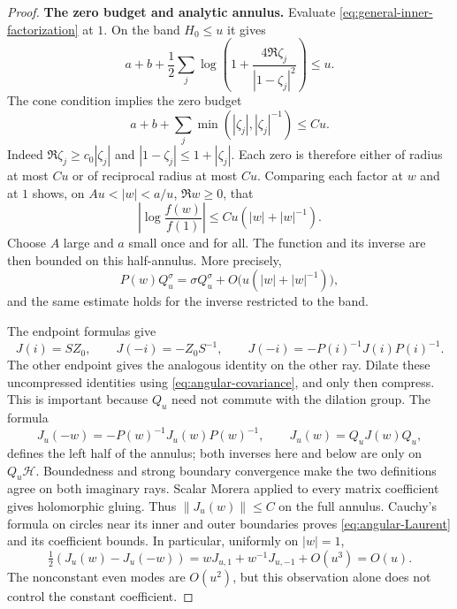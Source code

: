 \begin{proof}
\smallskip\noindent\textbf{The zero budget and analytic annulus.}
Evaluate \eqref{eq:general-inner-factorization} at $1$. On the band
$H_0\le u$ it gives
\[
 a+b+\frac12\sum_j
 \log\left(1+\frac{4\Re\zeta_j}{|1-\zeta_j|^2}\right)\le u.
\]
The cone condition implies the zero budget
\begin{equation}\label{eq:angular-zero-budget}
 a+b+\sum_j\min(|\zeta_j|,|\zeta_j|^{-1})\le Cu.
\end{equation}
Indeed $\Re\zeta_j\ge c_0|\zeta_j|$ and
$|1-\zeta_j|\le1+|\zeta_j|$.  Each zero is therefore either of
radius at most $Cu$ or of reciprocal radius at most $Cu$.
Comparing each factor at $w$ and at $1$ shows, on
$Au<|w|<a/u$, $\Re w\ge0$, that
\[
 \left|\log\frac{f(w)}{f(1)}\right|
 \le Cu(|w|+|w|^{-1}).
\]
Choose $A$ large and $a$ small once and for all.  The function and its
inverse are then bounded on this half-annulus.  More precisely,
\begin{equation}\label{eq:angular-band-sign}
 P(w)Q_u^\sigma=\sigma Q_u^\sigma
       +O\bigl(u(|w|+|w|^{-1})\bigr),
\end{equation}
and the same estimate holds for the inverse restricted to the band.

The endpoint formulas give
\[
 J(i)=SZ_0,\qquad J(-i)=-Z_0S^{-1},\qquad
 J(-i)=-P(i)^{-1}J(i)P(i)^{-1}.
\]
The other endpoint gives the analogous identity on the other ray.
Dilate these uncompressed identities using
\eqref{eq:angular-covariance}, and only then compress.  This is
important because $Q_u$ need not commute with the dilation group.
The formula
\begin{equation}\label{eq:angular-current-gluing}
 J_u(-w)=-P(w)^{-1}J_u(w)P(w)^{-1},\qquad
 J_u(w)=Q_uJ(w)Q_u,
\end{equation}
defines the left half of the annulus; both inverses here and below are
only on $Q_u\mathcal H$.  Boundedness and strong boundary convergence
make the two definitions agree on both imaginary rays.  Scalar Morera
applied to every matrix coefficient gives holomorphic gluing.  Thus
$\|J_u(w)\|\le C$ on the full annulus.  Cauchy's formula on circles
near its inner and outer boundaries proves
\eqref{eq:angular-Laurent} and its coefficient bounds.  In particular,
uniformly on $|w|=1$,
\begin{equation}\label{eq:angular-odd-expansion}
 \tfrac12(J_u(w)-J_u(-w))
 =wJ_{u,1}+w^{-1}J_{u,-1}+O(u^3)=O(u).
\end{equation}
The nonconstant even modes are $O(u^2)$, but this observation alone
does not control the constant coefficient.


\end{proof}
